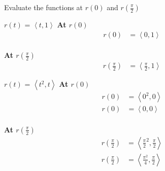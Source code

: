\documentclass{article}
\begin{document}
\begin{example}{Evaluate the functions at $r(0)$ and $r\left(\frac{\pi}{2}\right)$}

	\begin{subproblem}{$r(t)$ = $\left<t, 1\right>$}
		\textbf{At $r\left(0\right)$}
		\[\begin{split}
			r(0) &= \left<0, 1\right>
		\end{split}\] \\
		\textbf{At $r\left(\frac{\pi}{2}\right)$}
		\[
			\begin{split}
			r(\frac{\pi}{2}) &= \left<\frac{\pi}{2}, 1\right>
			\end{split}
		\]
	\end{subproblem}

	\begin{subproblem}{$r(t)$ = $\left<t^2, t\right>$}
		\textbf{At $r\left(0\right)$}
		\[\begin{split}
			r(0) &= \left<0^2, 0\right> \\
			r(0) &= \left<0, 0\right>
		\end{split}\] \\
		\textbf{At $r\left(\frac{\pi}{2}\right)$}
		\[
			\begin{split}
			r(\frac{\pi}{2}) &= \left<\frac{\pi}{2}^2, \frac{\pi}{2}\right> \\
			r(\frac{\pi}{2}) &= \left<\frac{\pi^2}{4}, \frac{\pi}{2}\right>
			\end{split}
		\]
	\end{subproblem}

\end{example}
\end{document}
